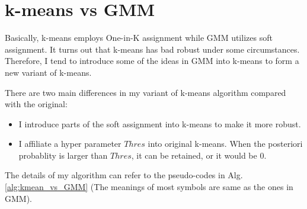 \documentclass[12pt,a4paper]{article}
\theoremstyle{definition}
\begin{document}
\noindent
\noindent{}

\vspace{-0.5\baselineskip}
\section{k-means vs GMM}

Basically, k-means employs One-in-K assignment while GMM utilizes soft assignment. It turns out that k-means has bad robust under some circumstances. Therefore, I tend to introduce some of the ideas in GMM into k-means to form a new variant of k-means.

\vspace{0.003\linewidth}
There are two main differences in my variant of k-means algorithm compared with the original:

\begin{itemize}
	\setlength{\itemsep}{0pt}
	\item I introduce parts of the soft assignment into k-means to make it more robust.
	
	\item I affiliate a hyper parameter $Thres$ into original k-means. When the posteriori probablity is larger than $Thres$, it can be retained, or it would be 0.
\end{itemize}

The details of my algorithm can refer to the pseudo-codes in Alg. \ref{alg:kmean_vs_GMM} (The meanings of most symbols are same as the ones in GMM).
\end{document}
